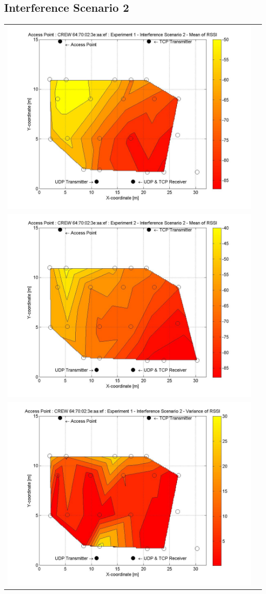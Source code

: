 \documentclass[11pt,a4paper,headinclude,footinclude,chapterprefix=on]{scrreprt}
\begin{document}
\subsection{Interference Scenario 2} 
\begin{longtable}
	{lr} 
	\includegraphics[width=13cm]{../../Source/plot/CREW_ef/ef_Wifi_Ex_1_Mean.jpg} \\
	\includegraphics[width=13cm]{../../Source/plot/CREW_ef/ef_Wifi_Ex_2_Mean.jpg} \\
	\includegraphics[width=13cm]{../../Source/plot/CREW_ef/ef_Wifi_Ex_1_Variance.jpg} \\

\end{longtable}
\end{document}
